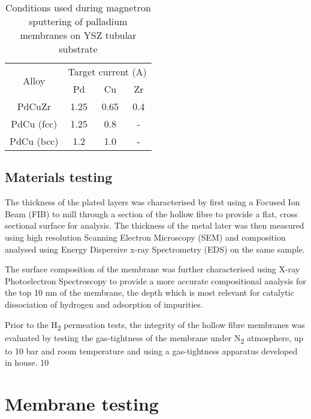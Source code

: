 \begin{table}[]
    \centering
    \caption{Conditions used during magnetron sputtering of palladium membranes on YSZ tubular substrate}
    \label{sputtering}
    \begin{tabular}{@{}cccc@{}}
    \toprule
    \multirow{2}{*}{Alloy} & \multicolumn{3}{c}{Target current (A)} \\
                           & Pd          & Cu          & Zr         \\ \midrule
    PdCuZr                 & 1.25        & 0.65        & 0.4        \\
    PdCu (fcc)             & 1.25        & 0.8         & -          \\
    PdCu (bcc)             & 1.2         & 1.0         & -          \\ \bottomrule
    \end{tabular}
    \end{table}

\subsection{Materials testing}\label{MatTest}
The thickness of the plated layers was characterised by first using a Focused Ion Beam (FIB) to mill through a section of the hollow fibre to provide a flat, cross sectional surface for analysis. The thickness of the metal later was then measured using high resolution Scanning Electron Microscopy (SEM) and composition analysed using Energy Dispersive x-ray Spectrometry (EDS) on the same sample. 

The surface composition of the membrane was further characterised using X-ray Photoelectron Spectroscopy to provide a more accurate compositional analysis for the top 10 nm of the membrane, the depth which is most relevant for catalytic dissociation of hydrogen and adsorption of impurities.

Prior to the H\textsubscript{2} permeation tests, the integrity of the hollow fibre membranes was evaluated by testing the gas-tightness of the membrane under N\textsubscript{2} atmosphere, up to 10 bar and room temperature and using a gas-tightness apparatus developed in house. 10

\section{Membrane testing}
